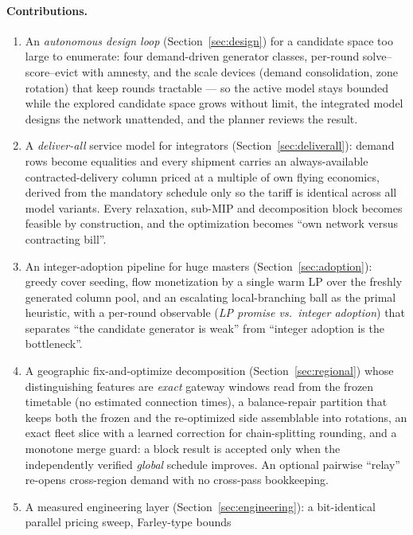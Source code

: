 \documentclass[11pt]{article}
\begin{document}
\paragraph{Contributions.}
\begin{enumerate}
\item An \emph{autonomous design loop} (Section~\ref{sec:design}) for a
  candidate space too large to enumerate: four demand-driven generator
  classes, per-round solve--score--evict with amnesty, and the scale devices
  (demand consolidation, zone rotation) that keep rounds tractable --- so the
  active model stays bounded while the explored candidate space grows without
  limit, the integrated model designs the network unattended, and the planner
  reviews the result.
\item A \emph{deliver-all} service model for integrators
  (Section~\ref{sec:deliverall}): demand rows become equalities and every
  shipment carries an always-available contracted-delivery column priced at a
  multiple of own flying economics, derived from the mandatory schedule only
  so the tariff is identical across all model variants. Every relaxation,
  sub-MIP and decomposition block becomes feasible by construction, and the
  optimization becomes ``own network versus contracting bill''.
\item An integer-adoption pipeline for huge masters
  (Section~\ref{sec:adoption}): greedy cover seeding, flow monetization by a
  single warm LP over the freshly generated column pool, and an escalating
  local-branching ball \cite{fischetti2003} as the primal heuristic, with a
  per-round observable (\emph{LP promise vs.\ integer adoption}) that
  separates ``the candidate generator is weak'' from ``integer adoption is
  the bottleneck''.
\item A geographic fix-and-optimize decomposition
  (Section~\ref{sec:regional}) whose distinguishing features are
  \emph{exact} gateway windows read from the frozen timetable (no estimated
  connection times), a balance-repair partition that keeps both the frozen
  and the re-optimized side assemblable into rotations, an exact fleet slice
  with a learned correction for chain-splitting rounding, and a monotone
  merge guard: a block result is accepted only when the independently
  verified \emph{global} schedule improves. An optional pairwise ``relay''
  re-opens cross-region demand with no cross-pass bookkeeping.
\item A measured engineering layer (Section~\ref{sec:engineering}):
  a bit-identical parallel pricing sweep, Farley-type bounds

\end{enumerate}
\end{document}
